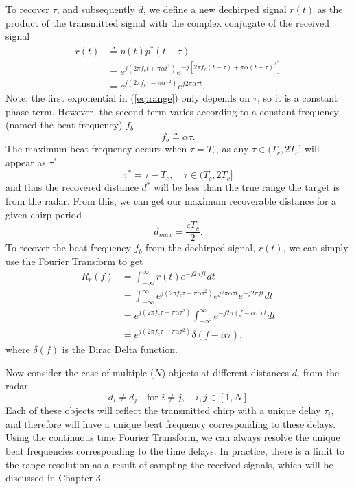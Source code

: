 To recover $\tau$, and subsequently $d$, we define a new dechirped signal $r(t)$
as the product of the transmitted signal with the complex conjugate of the
received signal
\begin{align}
	r(t) &\triangleq p(t)p^*(t-\tau) \\
	&= e^{j(2\pi f_c t + \pi \alpha t^2)}e^{-j[2\pi f_c (t-\tau) + \pi\alpha (t-\tau)^2 ]} \\
	&= e^{j(2\pi f_c \tau - \pi \alpha \tau^2)}e^{j2\pi\alpha\tau t}.\label{eq:range}
\end{align}
Note, the first exponential in (\ref{eq:range}) only depends on $\tau$, so it is
a constant phase term. However, the second term varies according to a constant
frequency (named the beat frequency) $f_b$
\begin{equation}
	f_b \triangleq \alpha \tau.
\end{equation}
The maximum beat frequency occurs when $\tau = T_c$, as any $\tau \in (T_c, 2T_c]$ will
appear as $\tau^*$
\begin{equation}
	\tau^* = \tau - T_c, \quad \tau \in (T_c, 2T_c]
\end{equation}
and thus the recovered distance $d^*$ will be less than the true range the
target is from the radar. From this, we can get our maximum recoverable distance
for a given chirp period
\begin{equation}
	d_{max} = \frac{c T_c}{2}.
\end{equation}
To recover the beat frequency $f_b$ from the dechirped signal, $r(t)$, we can
simply use the Fourier Transform to get
\begin{align}
	R_r(f) &= \int_{-\infty}^{\infty} r(t) e^{-j2 \pi ft} dt\\
	&= \int_{-\infty}^{\infty} e^{j(2\pi f_c \tau - \pi \alpha \tau^2)}e^{j2\pi\alpha\tau t} e^{-j2\pi ft}dt\\
	&= e^{j(2\pi f_c \tau - \pi \alpha
	\tau^2)}\int_{-\infty}^{\infty}e^{-j2\pi(f - \alpha\tau ) t} dt\\
	&= e^{j(2\pi f_c \tau - \pi \alpha \tau^2)}\delta (f - \alpha \tau),
\end{align}
where $\delta(f)$ is the Dirac Delta function.

Now consider the case of multiple ($N$) objects at different distances $d_i$ from the radar.
\begin{equation}
	d_i \not = d_j \quad \text{for } i \not = j, \quad i,j \in [1, N]
\end{equation}
Each of these objects will reflect the transmitted chirp with a unique delay
$\tau_i$, and therefore will have a unique beat frequency corresponding to these
delays. Using the continuous time Fourier Transform, we can always resolve the
unique beat frequencies corresponding to the time delays. In practice, there is
a limit to the range resolution as a result of sampling the received signals,
which will be discussed in Chapter 3.

